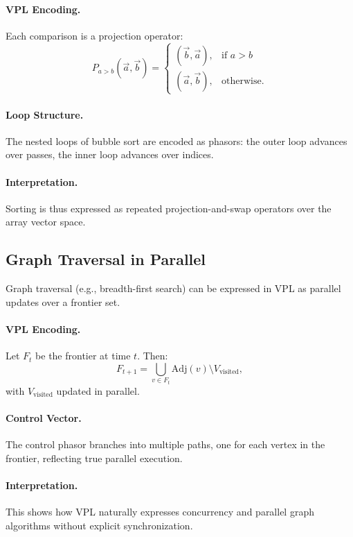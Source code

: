 \documentclass[12pt]{article}
\begin{document}
\paragraph{VPL Encoding.}
Each comparison is a projection operator:
\[
P_{a>b}(\vec{a}, \vec{b}) = 
\begin{cases}
(\vec{b}, \vec{a}), & \text{if } a > b \\
(\vec{a}, \vec{b}), & \text{otherwise.}
\end{cases}
\]

\paragraph{Loop Structure.}
The nested loops of bubble sort are encoded as phasors: the outer loop advances
over passes, the inner loop advances over indices.  

\paragraph{Interpretation.}
Sorting is thus expressed as repeated projection-and-swap operators over the
array vector space.

\subsection{Graph Traversal in Parallel}
Graph traversal (e.g., breadth-first search) can be expressed in VPL as
parallel updates over a frontier set.  

\paragraph{VPL Encoding.}
Let $F_t$ be the frontier at time $t$. Then:
\[
F_{t+1} = \bigcup_{v \in F_t} \mathrm{Adj}(v) \setminus V_{\text{visited}},
\]
with $V_{\text{visited}}$ updated in parallel.  

\paragraph{Control Vector.}
The control phasor branches into multiple paths, one for each vertex in the
frontier, reflecting true parallel execution.  

\paragraph{Interpretation.}
This shows how VPL naturally expresses concurrency and parallel graph algorithms
without explicit synchronization.
\end{document}
